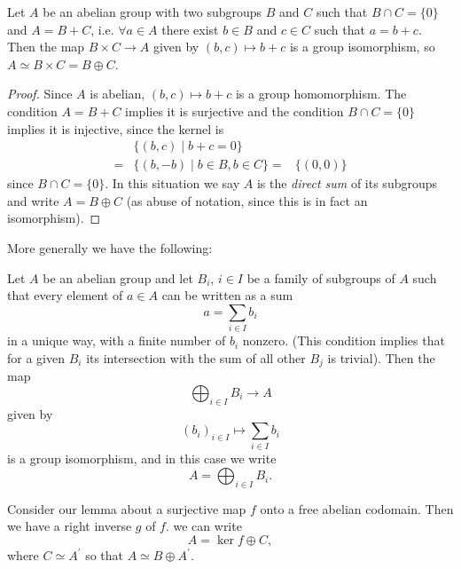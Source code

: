 \begin{lemma}
Let $A$ be an abelian group with two subgroups $B$ and $C$
such that $B \cap C = \{ 0 \}$ and $A = B + C$, i.e.
$\forall a \in A$ there exist $b \in B$ and $c \in C$ such that
$a = b + c$. Then the map $B \times C \to A$ given by
$(b, c) \mapsto b + c$ is a group isomorphism, so
$A \simeq B \times C = B \oplus C$.
\end{lemma}

\begin{proof}
Since $A$ is abelian, $(b, c) \mapsto b + c$ is a group
homomorphism. The condition $A = B + C$ implies it is surjective and
the condition $B \cap C = \{ 0 \}$ implies it is injective, since
the kernel is
\begin{align*}
 & \{ (b, c)  \mid b + c = 0 \} \\
=& \{ (b, -b) \mid b \in B, b \in C \}
=& \{ (0, 0) \}
\end{align*}
since $B \cap C = \{ 0 \}$. In this situation we say $A$ is the
\emph{direct sum} of its subgroups and write $A = B \oplus C$
(as abuse of notation, since this is in fact an isomorphism).
\end{proof}

More generally we have the following:
\begin{lemma}
Let $A$ be an abelian group and let $B_i$, $i \in I$ be a family of
subgroups of $A$ such that every element of $a \in A$ can be written
as a sum
$$
a = \sum_{i \in I} b_i
$$
in a unique way, with a finite number of $b_i$ nonzero.
(This condition implies that for a given $B_i$ its intersection with
 the sum of all other $B_j$ is trivial).
Then the map
$$
\bigoplus_{i \in I} B_i \to A
$$
given by
$$
(b_i)_{i \in I} \mapsto \sum_{i \in I} b_i
$$
is a group isomorphism, and in this case we write
$$
A = \bigoplus_{i \in I} B_i.
$$
\end{lemma}

\begin{lemma}
Consider our lemma about a surjective map $f$ onto a free abelian
codomain. Then we have a right inverse $g$ of $f$. we can write
$$
A = \ker f \oplus C,
$$
where $C \simeq A^\prime$ so that $A \simeq B \oplus A^\prime$.
\end{lemma}

